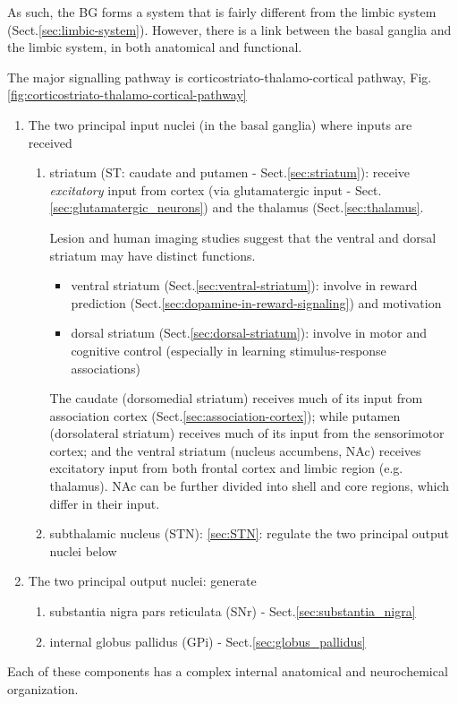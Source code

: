 As such, the BG forms a system that is fairly different from the limbic system
(Sect.\ref{sec:limbic-system}). However, there is a link between the basal
ganglia and the limbic system, in both anatomical and functional.


The major signalling pathway is corticostriato-thalamo-cortical pathway,
Fig.\ref{fig:corticostriato-thalamo-cortical-pathway}
\begin{enumerate}
  \item The two principal input nuclei (in the basal ganglia) where inputs are
  received 

\begin{enumerate}

  \item striatum (ST: caudate and putamen -   Sect.\ref{sec:striatum}): receive
  {\it excitatory} input from cortex (via glutamatergic input -
  Sect.\ref{sec:glutamatergic_neurons}) and the thalamus
  (Sect.\ref{sec:thalamus}.

Lesion  and  human imaging studies suggest that the ventral and  dorsal 
striatum  may  have  distinct  functions.
\begin{itemize}
  \item ventral striatum (Sect.\ref{sec:ventral-striatum}): involve in reward
  prediction (Sect.\ref{sec:dopamine-in-reward-signaling}) and motivation
  
  \item dorsal striatum (Sect.\ref{sec:dorsal-striatum}): involve in motor and
  cognitive control (especially in learning stimulus-response associations)

\end{itemize}

The caudate (dorsomedial striatum) receives much of its input from association
cortex (Sect.\ref{sec:association-cortex}); while putamen (dorsolateral
striatum) receives much of its input from the sensorimotor cortex; and the
ventral striatum (nucleus accumbens, NAc) receives excitatory input from both
frontal cortex and limbic region (e.g. thalamus). NAc can be further divided
into shell and core regions, which differ in their input.

  \item subthalamic nucleus (STN): \ref{sec:STN}: regulate the two principal
  output nuclei below
\end{enumerate}


  
  \item The two principal output nuclei: generate

\begin{enumerate}
  \item substantia nigra pars reticulata (SNr) - Sect.\ref{sec:substantia_nigra}
  \item internal globus pallidus (GPi) - Sect.\ref{sec:globus_pallidus}
\end{enumerate}

\end{enumerate}
Each of these components has a complex internal anatomical and neurochemical
organization.  

